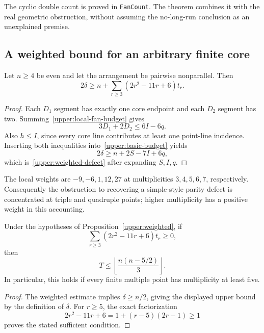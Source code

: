 The cyclic double count is proved in \texttt{FanCount}. The theorem  combines it with the real geometric obstruction, without assuming the no-long-run conclusion as an unexplained premise.

\subsection{A weighted bound for an arbitrary finite core}

\begin{proposition}
\label{upper:weighted}
Let $n\ge4$ be even and let the arrangement be pairwise nonparallel. Then
\begin{equation}
 2\delta\ge n+\sum_{r\ge3}(2r^2-11r+6)t_r.
 \label{upper:weighted-defect}
\end{equation}
\end{proposition}

\begin{proof}
Each $D_1$ segment has exactly one core endpoint and each $D_2$ segment has two. Summing~\eqref{upper:local-fan-budget} gives
\[
 3D_1+2D_2\le6I-6q.
\]
Also $h\le I$, since every core line contributes at least one point-line incidence. Inserting both inequalities into~\eqref{upper:basic-budget} yields
\[
 2\delta\ge n+2S-7I+6q,
\]
which is~\eqref{upper:weighted-defect} after expanding $S,I,q$.
\end{proof}

The local weights are $-9,-6,1,12,27$ at multiplicities $3,4,5,6,7$, respectively. Consequently the obstruction to recovering a simple-style parity defect is concentrated at triple and quadruple points; higher multiplicity has a positive weight in this accounting.

\begin{corollary}
\label{upper:high-multiplicity}
Under the hypotheses of Proposition~\ref{upper:weighted}, if
\[
 \sum_{r\ge3}(2r^2-11r+6)t_r\ge0,
\]
then
\[
 T\le\left\lfloor\frac{n(n-5/2)}3\right\rfloor.
\]
In particular, this holds if every finite multiple point has multiplicity at least five.
\end{corollary}

\begin{proof}
The weighted estimate implies $\delta\ge n/2$, giving the displayed upper bound by the definition of $\delta$. For $r\ge5$, the exact factorization
\[
 2r^2-11r+6=1+(r-5)(2r-1)\ge1
\]
proves the stated sufficient condition.
\end{proof}

